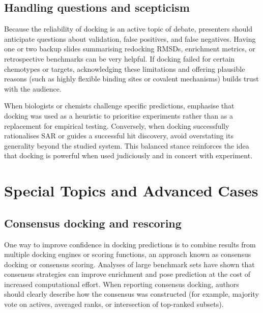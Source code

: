 \documentclass[12pt]{article}
\begin{document}
\subsection{Handling questions and scepticism}

Because the reliability of docking is an active topic of debate, presenters should anticipate questions about validation, false positives, and false negatives.\cite{CH11_Warren2006,CH11_BindingAffinity2018,CH11_Plewczynski2011} 
Having one or two backup slides summarising redocking RMSDs, enrichment metrics, or retrospective benchmarks can be very helpful.\cite{CH11_Warren2006,CH11_Forli2015,CH11_ConsensusDocking2023} 
If docking failed for certain chemotypes or targets, acknowledging these limitations and offering plausible reasons (such as highly flexible binding sites or covalent mechanisms) builds trust with the audience.\cite{CH11_Kitchen2004,CH11_BindingAffinity2018,CH11_IsItReliable2018} 

When biologists or chemists challenge specific predictions, emphasise that docking was used as a heuristic to prioritise experiments rather than as a replacement for empirical testing.\cite{CH11_Forli2015,CH11_Cheng2012,CH11_zhu2022} 
Conversely, when docking successfully rationalises SAR or guides a successful hit discovery, avoid overstating its generality beyond the studied system.\cite{CH11_Kitchen2004,CH11_BindingAffinity2018,CH11_Warren2006} 
This balanced stance reinforces the idea that docking is powerful when used judiciously and in concert with experiment.\cite{CH11_Forli2015,CH11_zhu2022,CH11_cosconati2010} 

\section{Special Topics and Advanced Cases}

\subsection{Consensus docking and rescoring}

One way to improve confidence in docking predictions is to combine results from multiple docking engines or scoring functions, an approach known as consensus docking or consensus scoring.\cite{CH11_ConsensusDocking2023,CH11_EmpiricalScoring2018,CH11_Plewczynski2011} 
Analyses of large benchmark sets have shown that consensus strategies can improve enrichment and pose prediction at the cost of increased computational effort.\cite{CH11_ConsensusDocking2023,CH11_Warren2006,CH11_Glide2004} 
When reporting consensus docking, authors should clearly describe how the consensus was constructed (for example, majority vote on actives, averaged ranks, or intersection of top-ranked subsets).\cite{CH11_ConsensusDocking2023,CH11_EmpiricalScoring2018,CH11_Forli2015} 
\end{document}
